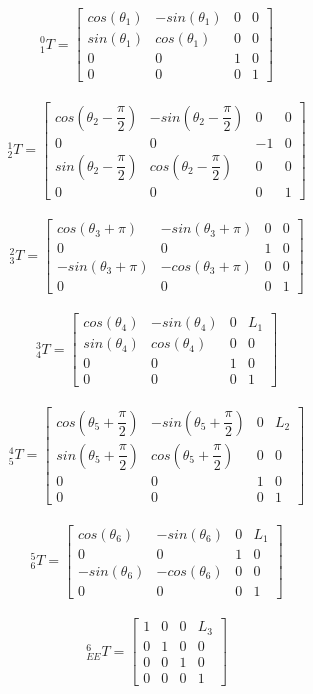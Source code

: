 \documentclass[12pt]{article}
\begin{document}
\[^0_{1}T=\left[
\begin{array}{cccc}
cos(\theta_1) & -sin(\theta_1) & 0 & 0 \\
sin(\theta_1) & cos(\theta_1) & 0 & 0 \\
0 & 0 & 1 & 0\\
0 & 0 & 0 & 1
\end{array} \right]\]
\ 
\[^1_{2}T=\left[
\begin{array}{cccc}
cos(\theta_2 - \dfrac{\pi}{2}) & -sin(\theta_2 - \dfrac{\pi}{2}) & 0 & 0 \\
0 & 0 & -1 & 0\\
sin(\theta_2 - \dfrac{\pi}{2}) & cos(\theta_2 - \dfrac{\pi}{2}) & 0 & 0 \\
0 & 0 & 0 & 1
\end{array} \right]\]
\ 
\[^2_{3}T=\left[
\begin{array}{cccc}
cos(\theta_3 + \pi) & -sin(\theta_3 + \pi) & 0 & 0 \\
0 & 0 & 1 & 0\\
-sin(\theta_3 + \pi) & -cos(\theta_3 + \pi) & 0 & 0 \\
0 & 0 & 0 & 1
\end{array} \right]\]
\ 
\[^3_{4}T=\left[
\begin{array}{cccc}
cos(\theta_4) & -sin(\theta_4) & 0 & L_1 \\
sin(\theta_4) & cos(\theta_4) & 0 & 0 \\
0 & 0 & 1 & 0\\
0 & 0 & 0 & 1
\end{array} \right]\]
\
\[^4_{5}T=\left[
\begin{array}{cccc}
cos(\theta_5 + \dfrac{\pi}{2}) & -sin(\theta_5 + \dfrac{\pi}{2}) & 0 & L_2 \\
sin(\theta_5 + \dfrac{\pi}{2}) & cos(\theta_5 + \dfrac{\pi}{2}) & 0 & 0 \\
0 & 0 & 1 & 0\\
0 & 0 & 0 & 1
\end{array} \right]\]
\
\[^5_{6}T=\left[
\begin{array}{cccc}
cos(\theta_6) & -sin(\theta_6) & 0 & L_1 \\
0 & 0 & 1 & 0\\
- sin(\theta_6) & -cos(\theta_6) & 0 & 0 \\
0 & 0 & 0 & 1
\end{array} \right]\]
\
\[^6_{EE}T=\left[
\begin{array}{cccc}
1 & 0 & 0 & L_3 \\
0 & 1 & 0 & 0 \\
0 & 0 & 1 & 0\\
0 & 0 & 0 & 1
\end{array} \right]\]
\end{document}
